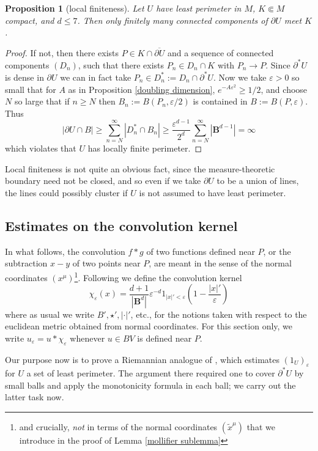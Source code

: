 \documentclass[reqno,12pt,letterpaper]{amsart}
\newcommand{\Ball}{\mathbf{B}}
\newtheorem{proposition}[theorem]{Proposition}
\theoremstyle{definition}
\numberwithin{equation}{section}
\begin{document}
\begin{proposition}[local finiteness]\label{local finiteness}
Let $U$ have least perimeter in $M$, $K \Subset M$ compact, and $d \leq 7$. Then only finitely many connected components of $\partial U$ meet $K$.
\end{proposition}
\begin{proof}
If not, then there exists $P \in K \cap \overline{\partial U}$ and a sequence of connected components $(D_n)$, such that there exists $P_n \in D_n \cap K$ with $P_n \to P$.
Since $\partial^* U$ is dense in $\partial U$ we can in fact take $P_n \in D_n^* := D_n \cap \partial^* U$.
Now we take $\varepsilon > 0$ so small that for $A$ as in Proposition \ref{doubling dimension}, $e^{-A\varepsilon^2} \geq 1/2$, and choose $N$ so large that if $n \geq N$ then $B_n := B(P_n, \varepsilon/2)$ is contained in $B := B(P, \varepsilon)$.
Thus
$$|\partial U \cap B| \geq \sum_{n=N}^\infty |D_n^* \cap B_n| \geq \frac{\varepsilon^{d - 1}}{2^d} \sum_{n=N}^\infty |\Ball^{d - 1}| = \infty$$
which violates that $U$ has locally finite perimeter.
\end{proof}

Local finiteness is not quite an obvious fact, since the measure-theoretic boundary need not be closed, and so even if we take $\partial U$ to be a union of lines, the lines could possibly cluster if $U$ is not assumed to have least perimeter.

\subsection{Estimates on the convolution kernel}
In what follows, the convolution $f * g$ of two functions defined near $P$, or the subtraction $x - y$ of two points near $P$, are meant in the sense of the normal coordinates $(x^\mu)$\footnote{and crucially, \emph{not} in terms of the normal coordinates $(\tilde x^\mu)$ that we introduce in the proof of Lemma \ref{mollifier sublemma}}. Following \cite[Chapter 7]{Giusti77} we define the convolution kernel
$$\chi_\varepsilon(x) = \frac{d + 1}{|\Ball^d|} \varepsilon^{-d}1_{|x|' < \varepsilon} \left(1 - \frac{|x|'}{\varepsilon}\right)$$
where as usual we write $B', \star', |\cdot|'$, etc., for the notions taken with respect to the euclidean metric obtained from normal coordinates.
For this section only, we write $u_\varepsilon = u * \chi_\varepsilon$ whenever $u \in BV$ is defined near $P$.

Our purpose now is to prove a Riemannian analogue of \cite[Theorem 7.3]{Giusti77}, which estimates $(1_U)_\varepsilon$ for $U$ a set of least perimeter.
The argument there required one to cover $\partial^* U$ by small balls and apply the monotonicity formula in each ball; we carry out the latter task now.
\end{document}
